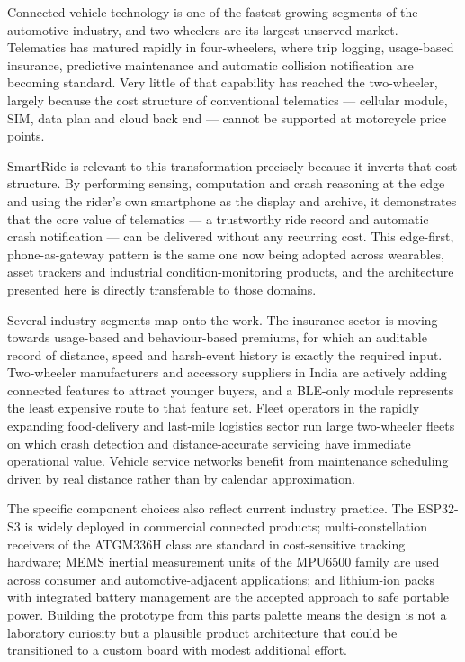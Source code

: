 \documentclass[12pt,a4paper,oneside]{report}
\begin{document}
Connected-vehicle technology is one of the fastest-growing segments of the automotive
industry, and two-wheelers are its largest unserved market. Telematics has matured rapidly
in four-wheelers, where trip logging, usage-based insurance, predictive maintenance and
automatic collision notification are becoming standard. Very little of that capability has
reached the two-wheeler, largely because the cost structure of conventional telematics ---
cellular module, SIM, data plan and cloud back end --- cannot be supported at motorcycle
price points.

SmartRide is relevant to this transformation precisely because it inverts that cost
structure. By performing sensing, computation and crash reasoning at the edge and using the
rider's own smartphone as the display and archive, it demonstrates that the core value of
telematics --- a trustworthy ride record and automatic crash notification --- can be
delivered without any recurring cost. This edge-first, phone-as-gateway pattern is the same
one now being adopted across wearables, asset trackers and industrial condition-monitoring
products, and the architecture presented here is directly transferable to those domains.

Several industry segments map onto the work. The insurance sector is moving towards
usage-based and behaviour-based premiums, for which an auditable record of distance, speed
and harsh-event history is exactly the required input. Two-wheeler manufacturers and
accessory suppliers in India are actively adding connected features to attract younger
buyers, and a BLE-only module represents the least expensive route to that feature set.
Fleet operators in the rapidly expanding food-delivery and last-mile logistics sector run
large two-wheeler fleets on which crash detection and distance-accurate servicing have
immediate operational value. Vehicle service networks benefit from maintenance scheduling
driven by real distance rather than by calendar approximation.

The specific component choices also reflect current industry practice. The ESP32-S3 is
widely deployed in commercial connected products; multi-constellation receivers of the
ATGM336H class are standard in cost-sensitive tracking hardware; MEMS inertial measurement
units of the MPU6500 family are used across consumer and automotive-adjacent applications;
and lithium-ion packs with integrated battery management are the accepted approach to safe
portable power. Building the prototype from this parts palette means the design is not a
laboratory curiosity but a plausible product architecture that could be transitioned to a
custom board with modest additional effort.
\end{document}
